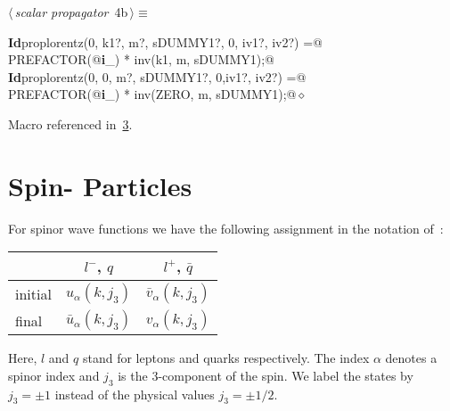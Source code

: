 \documentclass[a4paper,12pt]{amsart}
\renewcommand{\NWtarget}[2]{\hypertarget{#1}{#2}}
\renewcommand{\NWlink}[2]{\hyperlink{#1}{#2}}
\renewcommand{\NWtxtMacroRefIn}{Macro referenced in}
\renewcommand{\NWsep}{${\diamond}$}
\begin{document}
\begin{flushleft} \small
\begin{minipage}{\linewidth}\label{scrap5}\raggedright\small
\NWtarget{nuweb4b}{} $\langle\,${\itshape scalar propagator}\nobreak\ {\footnotesize {4b}}$\,\rangle\equiv$
\vspace{-1ex}
\begin{list}{}{} \item
\mbox{}\verb@@\hbox{\sffamily\bfseries Id}\verb@ proplorentz(0, k1?, m?, sDUMMY1?, 0, iv1?, iv2?) =@\\
\mbox{}\verb@   PREFACTOR(@\hbox{\sffamily\bfseries i}\verb@_) * inv(k1, m, sDUMMY1);@\\
\mbox{}\verb@@\hbox{\sffamily\bfseries Id}\verb@ proplorentz(0, 0, m?, sDUMMY1?, 0,iv1?, iv2?) =@\\
\mbox{}\verb@   PREFACTOR(@\hbox{\sffamily\bfseries i}\verb@_) * inv(ZERO, m, sDUMMY1);@{\NWsep}
\end{list}
\vspace{-1.5ex}
\footnotesize
\begin{list}{}{\setlength{\itemsep}{-\parsep}\setlength{\itemindent}{-\leftmargin}}
\item \NWtxtMacroRefIn\ \NWlink{nuweb3}{3}.

\item{}
\end{list}
\end{minipage}\vspace{4ex}
\end{flushleft}

\section{Spin-\texorpdfstring{}{1/2} Particles}
For spinor wave functions we have the following assignment in the
notation of~\cite{1}:
\begin{center}
\begin{tabular}{l|cc}
     &     $l^-$, $q$ & $l^+$, $\bar{q}$\\
\hline
initial & $u_\alpha(k, j_3)$ & $\bar{v}_\alpha(k, j_3)$ \\
final & $\bar{u}_\alpha(k, j_3)$ & $v_\alpha(k, j_3)$
\end{tabular}
\end{center}
Here, $l$ and $q$ stand for leptons and quarks respectively.
The index $\alpha$ denotes a spinor index and $j_3$ is the 3-component
of the spin.
We label the states by $j_3=\pm1$ instead of the physical values
$j_3=\pm1/2$.
\end{document}

